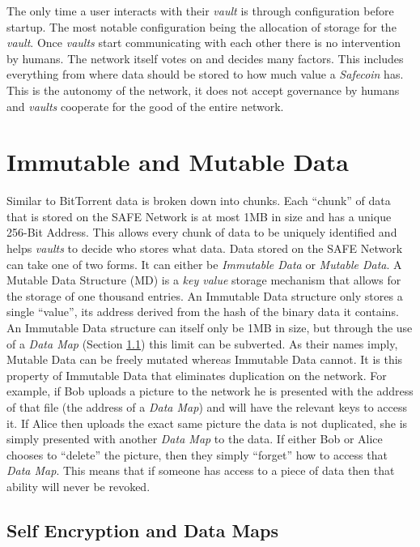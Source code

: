 The only time a user interacts with their \textit{vault} is through configuration before startup. The most notable configuration being the allocation of storage for the \textit{vault}. Once \textit{vaults} start communicating with each other there is no intervention by humans. The network itself votes on and decides many factors. This includes everything from where data should be stored to how much value a \textit{Safecoin} has. This is the autonomy of the network, it does not accept governance by humans and \textit{vaults} cooperate for the good of the entire network.

\section{Immutable and Mutable Data}

Similar to BitTorrent data is broken down into chunks. Each ``chunk'' of data that is stored on the SAFE Network is at most 1MB in size and has a unique 256-Bit Address. This allows every chunk of data to be uniquely identified and helps \textit{vaults} to decide who stores what data. Data stored on the SAFE Network can take one of two forms. It can either be \textit{Immutable Data} or \textit{Mutable Data}. A Mutable Data Structure (MD) is a \textit{key value} storage mechanism that allows for the storage of one thousand entries. An Immutable Data structure only stores a single ``value'', its address derived from the hash of the binary data it contains. An Immutable Data structure can itself only be 1MB in size, but through the use of a \textit{Data Map} (Section \ref{subsec:self-encryption-data-map}) this limit can be subverted. As their names imply, Mutable Data can be freely mutated whereas Immutable Data cannot. It is this property of Immutable Data that eliminates duplication on the network. For example, if Bob uploads a picture to the network he is presented with the address of that file (the address of a \textit{Data Map}) and will have the relevant keys to access it. If Alice then uploads the exact same picture the data is not duplicated, she is simply presented with another \textit{Data Map} to the data. If either Bob or Alice chooses to ``delete'' the picture, then they simply ``forget'' how to access that \textit{Data Map}. This means that if someone has access to a piece of data then that ability will never be revoked.

\subsection{Self Encryption and Data Maps}
\label{subsec:self-encryption-data-map}

